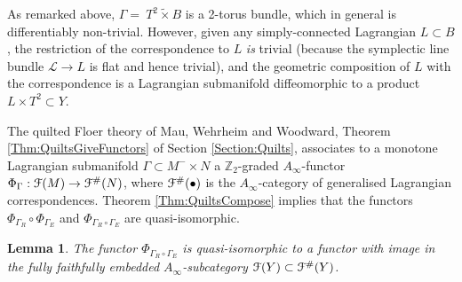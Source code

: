 \documentclass[reqno,10pt]{amsart}
\numberwithin{equation}{section}
\newcommand{\bZ}{{\mathbb Z}}
\newcommand{\scrF}{\EuScript{F}}
\newtheorem{Lemma}[thm]{Lemma}
\theoremstyle{remark}
\begin{document}
As remarked above, $\Gamma= \ T^2\widetilde{\times} B$ is a 2-torus bundle, which in general is differentiably non-trivial.  However, given any simply-connected Lagrangian $L\subset B$, the restriction of the correspondence to $L$ \emph{is} trivial (because the symplectic line bundle $\mathcal{L} \rightarrow L$ is flat and hence trivial), and the geometric composition of $L$ with the correspondence is a Lagrangian submanifold diffeomorphic to a product $L\times T^2 \subset Y$.

The quilted Floer theory of Mau, Wehrheim and Woodward, Theorem \ref{Thm:QuiltsGiveFunctors} of Section \ref{Section:Quilts},  associates to a monotone Lagrangian submanifold $\Gamma \subset M^-\times N$ a $\bZ_2$-graded $A_{\infty}$-functor $\Phi_{\Gamma}: \scrF(M) \rightarrow \scrF^{\#}(N)$, where $\scrF^{\#}(\bullet)$ is the $A_{\infty}$-category of generalised Lagrangian correspondences.  Theorem \ref{Thm:QuiltsCompose} implies that the functors $\Phi_{\Gamma_R}\circ\Phi_{\Gamma_E}$ and $\Phi_{\Gamma_R\circ \Gamma_E}$ are quasi-isomorphic. 

\begin{Lemma} \label{Lem:ExtendedFukNotNeeded}
The functor $\Phi_{\Gamma_R\circ\Gamma_E}$ is quasi-isomorphic to a functor with image in the fully faithfully embedded $A_{\infty}$-subcategory $\scrF(Y) \subset \scrF^{\#}(Y)$.
\end{Lemma}
\end{document}
